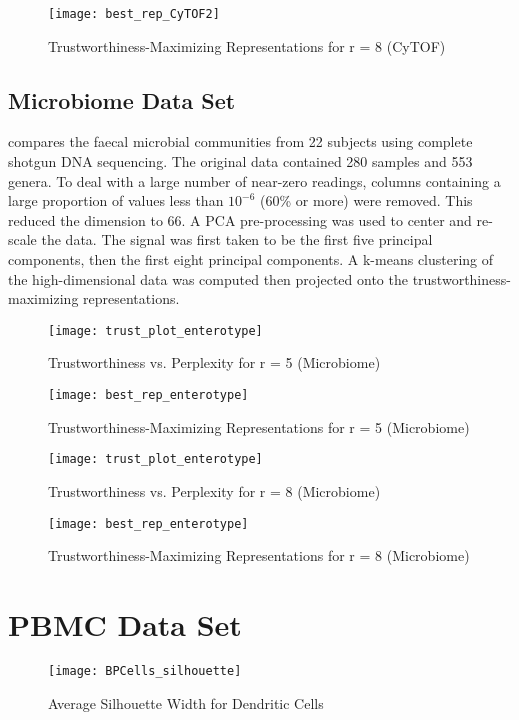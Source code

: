 \documentclass{article}
\begin{document}
\begin{figure}[H]
\centering
\texttt{[image: best\_rep\_CyTOF2]}
\caption{Trustworthiness-Maximizing Representations for r = 8 (CyTOF)}
\end{figure}

\subsection{Microbiome Data Set}
\cite{enterotype data} compares the faecal microbial communities from 22 subjects using complete shotgun DNA sequencing. The original data contained 280 samples and 553 genera. To deal with a large number of near-zero readings, columns containing a large proportion of values less than $10^{-6}$ (60\% or more) were removed. This reduced the dimension to 66. A PCA pre-processing was used to center and re-scale the data. The signal was first taken to be the first five principal components, then the first eight principal components. A k-means clustering of the high-dimensional data was computed then projected onto the trustworthiness-maximizing representations.

\begin{figure}[H]
\centering
\texttt{[image: trust\_plot\_enterotype]}
\caption{Trustworthiness vs. Perplexity for r = 5 (Microbiome)}
\end{figure}

\begin{figure}[H]
\centering
\texttt{[image: best\_rep\_enterotype]}
\caption{Trustworthiness-Maximizing Representations for r = 5 (Microbiome)}
\end{figure}

\begin{figure}[H]
\centering
\texttt{[image: trust\_plot\_enterotype]}
\caption{Trustworthiness vs. Perplexity for r = 8 (Microbiome)}
\end{figure}

\begin{figure}[H]
\centering
\texttt{[image: best\_rep\_enterotype]}
\caption{Trustworthiness-Maximizing Representations for r = 8 (Microbiome)}
\end{figure}

\section{PBMC Data Set}

\begin{figure}[H]
\centering
\texttt{[image: BPCells\_silhouette]}
\caption{Average Silhouette Width for Dendritic Cells}
\end{figure}
\end{document}
